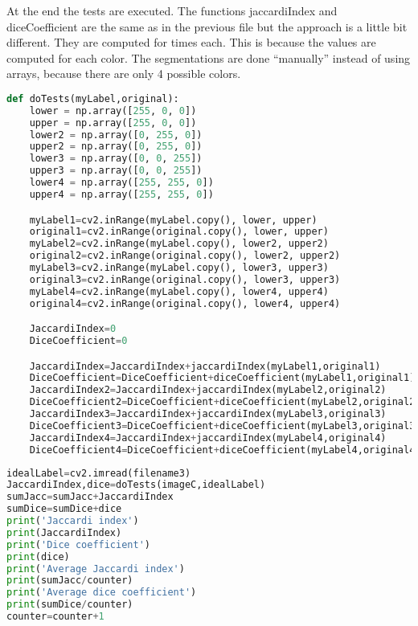 \documentclass[12pt]{article}
\begin{document}
\vspace{5mm}
At the end the tests are executed. The functions jaccardiIndex and diceCoefficient are the same as in the previous file but the approach is a little bit different. They are computed for times each. This is because the values are computed for each color. The segmentations are done “manually” instead of using arrays, because there are only 4 possible colors.
\vspace{5mm}
\begin{lstlisting}[language=Python]
def doTests(myLabel,original):
	lower = np.array([255, 0, 0])
	upper = np.array([255, 0, 0])
	lower2 = np.array([0, 255, 0])
	upper2 = np.array([0, 255, 0])
	lower3 = np.array([0, 0, 255])
	upper3 = np.array([0, 0, 255])
	lower4 = np.array([255, 255, 0])
	upper4 = np.array([255, 255, 0])

	myLabel1=cv2.inRange(myLabel.copy(), lower, upper)
	original1=cv2.inRange(original.copy(), lower, upper)
	myLabel2=cv2.inRange(myLabel.copy(), lower2, upper2)
	original2=cv2.inRange(original.copy(), lower2, upper2)
	myLabel3=cv2.inRange(myLabel.copy(), lower3, upper3)
	original3=cv2.inRange(original.copy(), lower3, upper3)
	myLabel4=cv2.inRange(myLabel.copy(), lower4, upper4)
	original4=cv2.inRange(original.copy(), lower4, upper4)

	JaccardiIndex=0
	DiceCoefficient=0

	JaccardiIndex=JaccardiIndex+jaccardiIndex(myLabel1,original1)
	DiceCoefficient=DiceCoefficient+diceCoefficient(myLabel1,original1)
	JaccardiIndex2=JaccardiIndex+jaccardiIndex(myLabel2,original2)
	DiceCoefficient2=DiceCoefficient+diceCoefficient(myLabel2,original2)
	JaccardiIndex3=JaccardiIndex+jaccardiIndex(myLabel3,original3)
	DiceCoefficient3=DiceCoefficient+diceCoefficient(myLabel3,original3)
	JaccardiIndex4=JaccardiIndex+jaccardiIndex(myLabel4,original4)
	DiceCoefficient4=DiceCoefficient+diceCoefficient(myLabel4,original4)
\end{lstlisting}
\vspace{5mm}
\begin{lstlisting}[language=Python]
idealLabel=cv2.imread(filename3)
JaccardiIndex,dice=doTests(imageC,idealLabel)
sumJacc=sumJacc+JaccardiIndex
sumDice=sumDice+dice
print('Jaccardi index')
print(JaccardiIndex)
print('Dice coefficient')
print(dice)
print('Average Jaccardi index')
print(sumJacc/counter)
print('Average dice coefficient')
print(sumDice/counter)
counter=counter+1
\end{lstlisting}
\end{document}

